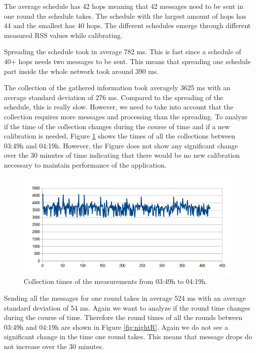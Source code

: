 The average schedule has 42 hops meaning that 42 messages need to be sent in one round the schedule takes. The schedule with the largest amount of hops has 44 and the smallest has 40 hops. The different schedules emerge through different measured RSS values while calibrating.

Spreading the schedule took in average 782 ms. This is fast since a schedule of 40+ hops needs two messages to be sent. This means that spreading one schedule part inside the whole network took around 390 ms.

The collection of the gathered information took averagely 3625 ms with an average standard deviation of 276 ms. Compared to the spreading of the schedule, this is really slow. However, we need to take into account that the collection requires more messages and processing than the spreading. To analyze if the time of the collection changes during the course of time and if a new calibration is needed, Figure \ref{fig:nightC} shows the times of all the collections between 03:49h and 04:19h. However, the Figure does not show any significant change over the 30 minutes of time indicating that there would be no new calibration necessary to maintain performance of the application.

\begin{figure}[htbp]
	\centering         
    \includegraphics[scale=0.75]{content/images/Experiment/NightCollection}
    \caption{Collection times of the measurements from 03:49h to 04:19h.}
	\label{fig:nightC}
\end{figure}

Sending all the messages for one round takes in average 524 ms with an average standard deviation of 54 ms. Again we want to analyze if the round time changes during the course of time. Therefore the round times of all the rounds between 03:49h and 04:19h are shown in Figure \ref{fig:nightR}. Again we do not see a significant change in the time one round takes. This means that message drops do not increase over the 30 minutes.

